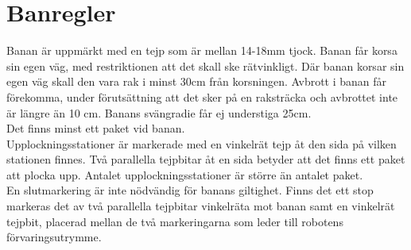\section{Banregler} \label{banregler}

Banan är uppmärkt med en tejp som är mellan 14-18mm tjock. Banan får korsa sin egen väg, med restriktionen att det skall ske rätvinkligt. Där banan korsar sin egen väg skall den vara rak i minst 30cm från korsningen. Avbrott i banan får förekomma, under förutsättning att det sker på en raksträcka och avbrottet inte är längre än 10 cm. Banans svängradie får ej understiga 25cm. \\
Det finns minst ett paket vid banan. \\
Upplockningsstationer är markerade med en vinkelrät tejp åt den sida på vilken stationen finnes. Två parallella tejpbitar åt en sida betyder att det finns ett paket att plocka upp. Antalet upplockningsstationer är större än antalet paket. \\
En slutmarkering är inte nödvändig för banans giltighet. Finns det ett stop markeras det av två parallella tejpbitar vinkelräta mot banan samt en vinkelrät tejpbit, placerad mellan de två markeringarna som leder till robotens förvaringsutrymme. \\
